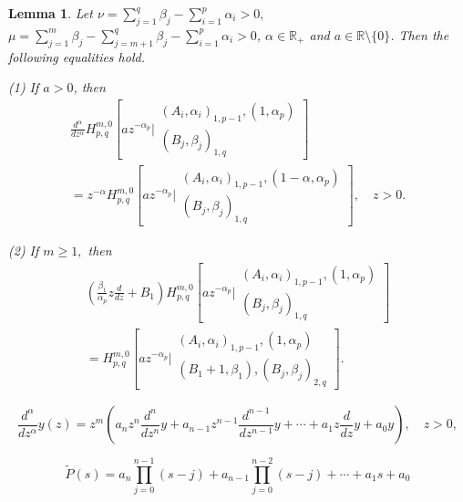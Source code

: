 \documentclass[10pt,a4paper]{amsart}
\newtheorem{lemma}{Lemma}
\begin{document}
\begin{lemma}\label{le5}
Let $\nu=\sum_{j=1}^{q}\beta_j-\sum_{i=1}^{p}\alpha_i> 0,$ $\mu=\sum\limits_{j=1}^{m}\beta_j-\sum\limits_{j=m+1}^{q}\beta_j-\sum\limits_{i=1}^{p}\alpha_i>0$, $\alpha\in \mathbb{R}_+$ and $a\in \mathbb{R}\setminus\{0\}$.  Then the following equalities hold.

(1) If $a>0$, then
\begin{multline*}
\frac{d^\alpha}{d z^\alpha}H_{p,q}^{m,0}\left[az^{-\alpha_p}\biggr\vert\begin{array}{c}
(A_i,\alpha_i)_{1,p-1}, (1, \alpha_p)\\
(B_j,\beta_j)_{1,q}
\end{array}\right]\\
=z^{-\alpha}H_{p,q}^{m,0}\left[az^{-\alpha_p}\biggr\vert\begin{array}{c}
(A_i,\alpha_i)_{1,p-1}, (1-\alpha, \alpha_p)\\
(B_j,\beta_j)_{1,q}
\end{array}\right],\quad z>0.
\end{multline*}

(2) If $m\ge 1,$ then
\begin{multline*}
\left(\frac{\beta_1}{\alpha_p}z\frac{d}{dz}+B_1\right)H_{p,q}^{m,0}\left[az^{-\alpha_p}\biggr\vert\begin{array}{c}
(A_i,\alpha_i)_{1,p-1}, (1, \alpha_p)\\
(B_j,\beta_j)_{1,q}
\end{array}\right]\\
=H_{p,q}^{m,0}\left[az^{-\alpha_p}\biggr\vert\begin{array}{c}
(A_i,\alpha_i)_{1,p-1}, (1, \alpha_p)\\
(B_1+1,\beta_1),(B_j,\beta_j)_{2,q}
\end{array}\right].
\end{multline*}
\end{lemma}

\begin{equation}\label{a1}
\frac{d^\alpha}{dz^\alpha}y(z)=
  z^m\left(a_nz^n\frac{d^n}{dz^n}y+a_{n-1}z^{n-1}\frac{d^{n-1}}{dz^{n-1}}y+\cdots+ a_1z\frac{d}{dz}y +a_0y\right), \quad z>0,
\end{equation} 

\begin{equation}\label{char}
    \widetilde  P(s)=a_n\prod\limits_{j=0}^{n-1}(s-j)+ a_{n-1}\prod\limits_{j=0}^{n-2}(s-j)+ \cdots+ a_1s +a_0
\end{equation}
\end{document}
